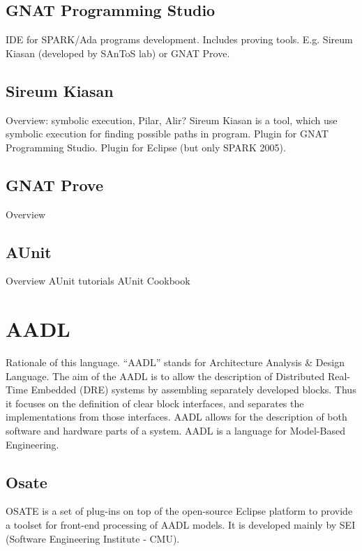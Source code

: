 \subsection{GNAT Programming Studio}
\label{background:spark:gps}
IDE for SPARK/Ada programs development. Includes proving tools. E.g. Sireum Kiasan (developed by SAnToS lab) or GNAT Prove.

\subsection{Sireum Kiasan}
\label{background:spark:sireum}
Overview: symbolic execution, Pilar, Alir\cite{THB}?
Sireum Kiasan\cite{DLR} is a tool, which use symbolic execution for finding possible paths in program.
Plugin for GNAT Programming Studio.
Plugin for Eclipse (but only SPARK 2005).

\subsection{GNAT Prove}
\label{background:spark:gnatprove}
Overview

\subsection{AUnit}
\label{background:spark:aunit}
Overview
AUnit tutorials \cite{AUnitTutorials:Online}
AUnit Cookbook \cite{AUnitCookbook:Online}


\section{AADL}
\label{background:aadl}
Rationale of this language.
“AADL” stands for Architecture Analysis \& Design Language. The aim of the AADL is to allow the description of Distributed Real-Time Embedded (DRE) systems by assembling separately developed blocks. Thus it focuses on the definition of clear block interfaces, and separates the implementations from those interfaces. AADL allows for the description of both software and hardware parts of a system. %
AADL is a language for Model-Based Engineering\cite{Fei13}.

\subsection{Osate}
\label{background:aadl:osate}
OSATE is a set of plug-ins on top of the open-source Eclipse platform to provide a toolset for front-end processing of AADL models. It is developed mainly by SEI (Software Engineering Institute - CMU). %



